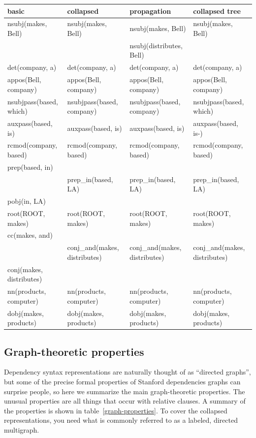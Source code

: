 \documentclass[11pt,letter]{article}
\begin{document}
{\scriptsize
\noindent
\begin{tabular} {@{}llll@{}} \hline
	\textbf{basic} & \textbf{collapsed} & \textbf{propagation} &\textbf{collapsed tree} \\ \hline
	nsubj(makes, Bell) & 	nsubj(makes, Bell) & 	nsubj(makes, Bell) & 	nsubj(makes, Bell)\\
	& & nsubj(distributes, Bell) & \\
	det(company, a) & det(company, a) & det(company, a) & det(company, a)\\
	appos(Bell, company) & appos(Bell, company) & appos(Bell, company) & appos(Bell, company)\\
	nsubjpass(based, which) & nsubjpass(based, company) & nsubjpass(based, company) & nsubjpass(based, which)\\
	auxpass(based, is) & auxpass(based, is) & auxpass(based, is) & auxpass(based, is-)\\
	rcmod(company, based) & rcmod(company, based) & rcmod(company, based) & rcmod(company, based)\\
	prep(based, in)  & & & \\
	& prep\_in(based, LA) & prep\_in(based, LA) & prep\_in(based, LA) \\
	pobj(in, LA)   &  &&\\
	root(ROOT, makes) & root(ROOT, makes) & root(ROOT, makes) & root(ROOT, makes)\\
	cc(makes, and) & & & \\
	&  conj\_and(makes, distributes) & conj\_and(makes, distributes) & conj\_and(makes, distributes)\\
	conj(makes, distributes) & & & \\
	nn(products, computer) & nn(products, computer) & nn(products, computer) & nn(products, computer) \\
	dobj(makes, products) & dobj(makes, products) & dobj(makes, products) & dobj(makes, products)\\ \hline
\end{tabular}}

\subsection{Graph-theoretic properties}

Dependency syntax representations are naturally thought of as ``directed graphs'',
but some of the precise formal properties of Stanford dependencies graphs can
surprise people, so here we summarize the main graph-theoretic
properties.
The unusual properties are all things that occur with relative clauses.
A summary of the properties is shown in table~\ref{graph-properties}.
To cover the collapsed representations, you need what is commonly referred to
as a labeled, directed multigraph.
\end{document}
